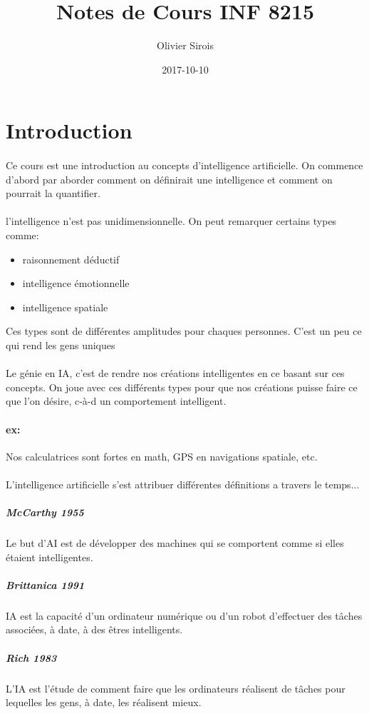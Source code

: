 \documentclass{book}
\title{Notes de Cours INF 8215}
\date{2017-10-10}
\author{Olivier Sirois}
\begin{document}
\maketitle
\newpage


\section{Introduction}
\paragraph{}
Ce cours est une introduction au concepts d'intelligence artificielle. On commence d'abord par aborder comment on définirait une intelligence et comment on pourrait la quantifier.
\paragraph{}
l'intelligence n'est pas unidimensionnelle. On peut remarquer certains types comme:
\begin{itemize}
\item raisonnement déductif
\item intelligence émotionnelle
\item intelligence spatiale
\end{itemize}
Ces types sont de différentes amplitudes pour chaques personnes. C'est un peu ce qui rend les gens uniques

\paragraph{}
Le génie en IA, c'est de rendre nos créations intelligentes en ce basant sur ces concepts. On joue avec ces différents types pour que nos créations puisse faire ce que l'on désire, c-à-d un comportement intelligent.
\paragraph{ex:}
Nos calculatrices sont fortes en math, GPS en navigations spatiale, etc.
\paragraph{}
L'intelligence artificielle s'est attribuer différentes définitions a travers le temps...
\subparagraph{McCarthy 1955}
Le but d’AI est de développer des machines qui se comportent
comme si elles étaient intelligentes.
\subparagraph{Brittanica 1991}
IA est la capacité d’un ordinateur numérique ou d’un robot
d’effectuer des tâches associées, à date, à des êtres intelligents.
\subparagraph{Rich 1983}
L’IA est l’étude de comment faire que les ordinateurs réalisent de
tâches pour lequelles les gens, à date, les réalisent mieux.
\end{document}
